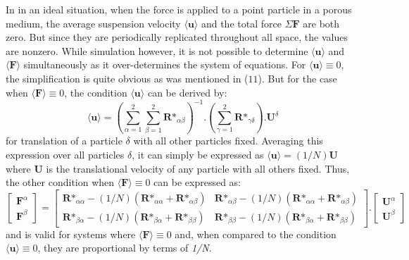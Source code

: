 \documentclass[12pt]{article}
\begin{document}
In in an ideal situation, when the force is applied to a point particle in a porous medium, the average suspension velocity $\langle \textbf{u} \rangle$ and the total force $\Sigma \textbf{F}$ are both zero. But since they are periodically replicated throughout all space, the values are nonzero. While simulation however, it is not possible to determine $\langle \textbf{u} \rangle$ and $\langle \textbf{F} \rangle$ simultaneously as it over-determines the system of equations. For $\langle \textbf{u} \rangle \equiv 0$, the simplification is quite obvious as was mentioned in ($11$). But for the case when $\langle \textbf{F} \rangle \equiv 0$, the condition $\langle \textbf{u} \rangle$ can be derived by:
\begin{equation}
\label{eq15}
\langle \textbf{u} \rangle = \left(\sum_{\alpha=1}^{2} \sum_{\beta=1}^{2} \textbf{R*}_{\alpha\beta}\right)^{-1} \textbf{.} \left(\sum_{\gamma=1}^{2} \textbf{R*}_{\gamma\delta}\right)\textbf{.}\textbf{U}^{\delta}
\end{equation}
for translation of a particle $\delta$ with all other particles fixed. Averaging this expression over all particles $\delta$, it can simply be expressed as $\langle \textbf{u} \rangle = (1/N)\textbf{U}$ where \textbf{U} is the translational velocity of any particle with all others fixed. Thus, the other condition when $\langle \textbf{F} \rangle\equiv 0$ can be expressed as:
\begin{equation}
\label{eq16}
\begin{bmatrix}
\textbf{F}^{\alpha}\\
\textbf{F}^{\beta}
\end{bmatrix}=
\begin{bmatrix}
 \textbf{R*}_{\alpha \alpha} - (1/N)(\textbf{R*}_{\alpha\alpha}+\textbf{R*}_{\alpha\beta})& \textbf{R*}_{\alpha\beta} - (1/N)(\textbf{R*}_{\alpha\alpha}+\textbf{R*}_{\alpha\beta}) \\
\textbf{R*}_{\beta\alpha} - (1/N)(\textbf{R*}_{\beta\alpha}+\textbf{R*}_{\beta\beta}) & \textbf{R*}_{\beta\beta} - (1/N)(\textbf{R*}_{\beta\alpha}+\textbf{R*}_{\beta\beta})
\end{bmatrix}.
\begin{bmatrix}
\textbf{U}^{\alpha}\\
\textbf{U}^{\beta}
\end{bmatrix}
\end{equation}
and is valid for systems where $\langle \textbf{F} \rangle\equiv 0$ and, when compared to the condition $\langle \textbf{u} \rangle\equiv 0$, they are proportional by terms of \textit{1/N}. 
\end{document}
